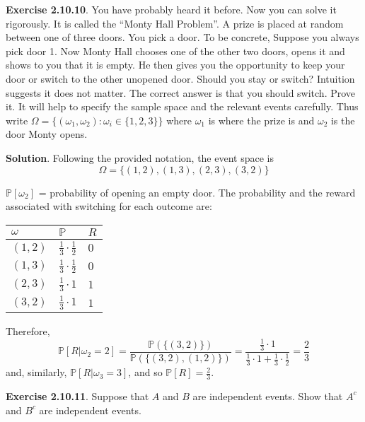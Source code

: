 \textbf{Exercise 2.10.10}. You have probably heard it before. Now you can solve it rigorously. It is called the ``Monty Hall Problem''. A prize is placed at random between one of three doors. You pick a door. To be concrete, Suppose you always pick door 1. Now Monty Hall chooses one of the other two doors, opens it and shows to you that it is empty. He then gives you the opportunity to keep your door or switch to the other unopened door. Should you stay or switch? Intuition suggests it does not matter. The correct answer is that you should switch. Prove it. It will help to specify the sample space and the relevant events carefully. Thus write
\(\Omega = \{ (\omega_{1}, \omega_{2}) : \omega_{i} \in \{ 1, 2, 3 \} \}\)
where \(\omega_{1}\) is where the prize is and \(\omega_{2}\) is the door Monty opens.

\textbf{Solution}. Following the provided notation, the event space is
\[ 
\Omega = \{ (1, 2), (1, 3), (2, 3), (3, 2) \} 
\]

\(\mathbb{P}[ \omega_{2}]\) = probability of opening an empty door. The
probability and the reward associated with switching for each outcome
are:

\begin{table}[H]
\centering
\begin{tabular}{@{}p{2cm}p{2cm}p{2cm} @{}}
\toprule
\(\omega\) & \(\mathbb{P}\) & \(R\) 
\\
\midrule
\((1, 2)\) & \(\displaystyle\frac{1}{3}\cdot\frac{1}{2}\) & \(0\) 
\\[2ex]
\((1, 3)\) & \(\displaystyle\frac{1}{3}\cdot\frac{1}{2}\) & \(0\) 
\\[2ex]
\((2, 3)\) & \(\displaystyle\frac{1}{3}\cdot1\) & \(1\) 
\\[2ex]
\((3, 2)\) & \(\displaystyle\frac{1}{3}\cdot1\) & \(1\) 
\\
\bottomrule
\end{tabular}
\end{table}

Therefore,
\[
\mathbb{P}[ R | \omega_{2} = 2 ] = \frac{\mathbb{P}(\{(3, 2)\})}{\mathbb{P}(\{ (3, 2), (1, 2) \})}= \frac{\displaystyle\frac{1}{3} \cdot 1}{\displaystyle \frac{1}{3} \cdot 1 + \frac{1}{3} \cdot \frac{1}{2}} = \frac{2}{3}
\]
and, similarly, \(\mathbb{P}[ R | \omega_{3} = 3 ]\), and so
\(\mathbb{P}[R] = \frac{2}{3}\).

\textbf{Exercise 2.10.11}. Suppose that \(A\) and \(B\) are independent
events. Show that \(A^{c}\) and \(B^{c}\) are independent events.

